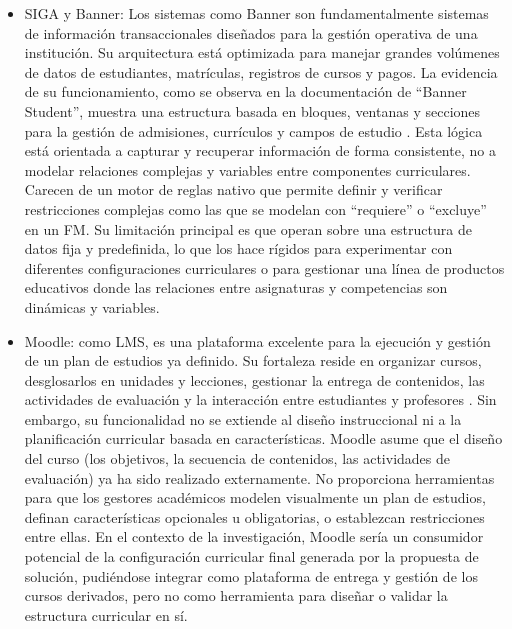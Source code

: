 \begin{itemize}
    \item SIGA y Banner: Los sistemas como Banner son fundamentalmente
    sistemas de información transaccionales diseñados para la gestión
    operativa de una institución. Su arquitectura está optimizada para
    manejar grandes volúmenes de datos de estudiantes, matrículas,
    registros de cursos y pagos. La evidencia de su funcionamiento, como
    se observa en la documentación de ``Banner Student'', muestra una
    estructura basada en bloques, ventanas y secciones para la gestión de
    admisiones, currículos y campos de estudio \citep{ellucian2015b_banner}. Esta lógica está orientada a capturar y recuperar información de
    forma consistente, no a modelar relaciones complejas y variables entre
    componentes curriculares. Carecen de un motor de reglas nativo que permite definir y verificar restricciones complejas como las que se
    modelan con ``requiere'' o ``excluye'' en un \ac{FM}. Su limitación
    principal es que operan sobre una estructura de datos fija y predefinida,
    lo que los hace rígidos para experimentar con diferentes configuraciones
    curriculares o para gestionar una línea de productos educativos donde
    las relaciones entre asignaturas y competencias son dinámicas y
    variables.

    \item Moodle: como \ac{LMS}, es una plataforma excelente para la ejecución y gestión de
    un plan de estudios ya definido. Su fortaleza reside en organizar cursos,
    desglosarlos en unidades y lecciones, gestionar la entrega de
    contenidos, las actividades de evaluación y la interacción entre
    estudiantes y profesores \citep{moodle2025overview}. Sin embargo, 
    su funcionalidad no se extiende al diseño instruccional ni a la 
    planificación curricular basada en
    características. Moodle asume que el diseño del curso (los objetivos, la
    secuencia de contenidos, las actividades de evaluación) ya ha sido
    realizado externamente. No proporciona herramientas para que los
    gestores académicos modelen visualmente un plan de estudios, definan
    características opcionales u obligatorias, o establezcan restricciones
    entre ellas. En el contexto de la investigación, Moodle sería un
    consumidor potencial de la configuración curricular final generada por
    la propuesta de solución, pudiéndose integrar como plataforma de entrega y gestión de los 
    cursos derivados, pero no como herramienta para diseñar o validar la estructura 
    curricular en sí.
\end{itemize}

